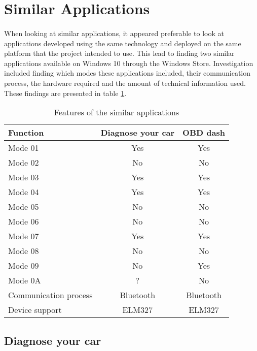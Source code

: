 \section{Similar Applications}
	\paragraph{}{
	When looking at similar applications, it appeared preferable to look at applications developed using the same technology and deployed on the same platform that the project intended to use. This lead to finding two similar applications available on Windows 10 through the Windows Store. Investigation included finding which modes these applications included, their communication process, the hardware required and the amount of technical information used. These findings are presented in table \ref{tab:Features}.
	}
	
	\begin{table}[h]
		\begin{center}				
			\begin{tabular}{| l | c | c |}
			\hline
			\textbf{Function} & \textbf{Diagnose your car}  &\textbf{OBD dash}\\
			\hline
			Mode 01 & Yes & Yes\\
			\hline
			Mode 02 & No & No\\
			\hline
			Mode 03 & Yes & Yes\\
			\hline
			Mode 04 & Yes & Yes\\
			\hline
			Mode 05 & No & No\\
			\hline
			Mode 06 & No & No\\
			\hline
			Mode 07 & Yes & Yes\\
			\hline
			Mode 08 & No & No\\
			\hline
			Mode 09 & No & Yes\\
			\hline
			Mode 0A & ? & No\\
			\hline
			Communication process & Bluetooth & Bluetooth\\
			\hline
			Device support & ELM327 & ELM327\\
			\hline			
			\end{tabular}
			\caption{Features of the similar applications}
			\label{tab:Features}
		\end{center}
	\end{table}
	
	\subsection{Diagnose your car}
